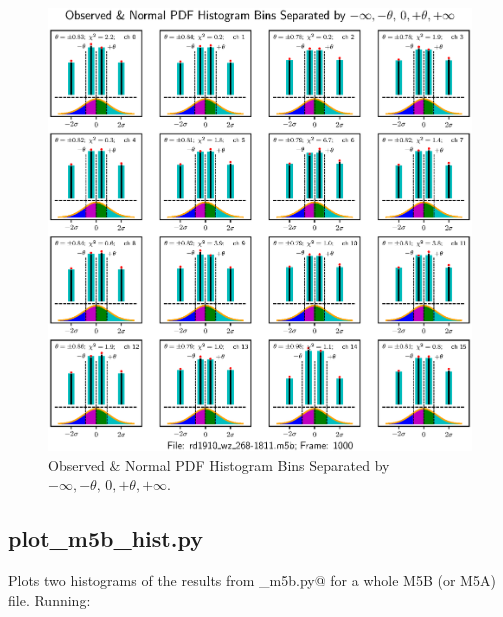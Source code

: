 \documentclass[letterpaper,twoside,12pt]{article}
\begin{document}
\noindent \verb@%run inspect_nt.py rd1910_wz_268-1811.m5b 575 1000 1@ \\

\begin{figure}[ht!]
  \begin{center}
  \includegraphics[width=35pc]{fig_4x4_Histograms_good.eps}
  \caption{\small Observed \& Normal PDF Histogram Bins Separated by $-\infty, -\theta, \, 0, +\theta, +\infty$.}
  \label{hists_good_4x4}
  \end{center}
\end{figure}



\subsection{plot\_m5b\_hist.py}

Plots two histograms of the results from \verb@gpu_m5b.py@ for a whole M5B (or M5A) file. Running: \\

\noindent \verb@%run plot_m5b_hist.py <M5B file name> <timestamp> @ \\
\end{document}
